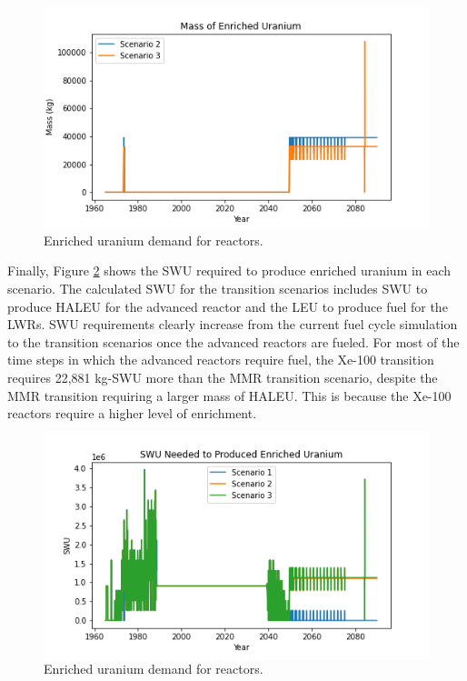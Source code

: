 \begin{figure}[ht]
    \centering
    \includegraphics[scale=0.5]{figures/enrichedU_advancedrx.png}
    \caption{Enriched uranium demand for reactors.}
    \label{fig:enriched_u}
\end{figure}

Finally, Figure \ref{fig:swu} shows the \gls{SWU} required to 
produce enriched uranium in each scenario. The calculated 
\gls{SWU} for the transition scenarios includes \gls{SWU} to 
produce \gls{HALEU} for the advanced reactor and the \gls{LEU}
to produce fuel for the \gls{LWR}s. \gls{SWU} requirements 
clearly increase from the current fuel cycle simulation to the 
transition scenarios once the advanced reactors are fueled. 
For most of the time steps in which the advanced reactors 
require fuel, the Xe-100 transition requires 22,881 kg-SWU 
more than the MMR transition scenario, despite the MMR 
transition requiring a larger mass of \gls{HALEU}. This is 
because the Xe-100 reactors require a higher level of 
enrichment.  

\begin{figure}[ht]
    \centering
    \includegraphics[scale=0.5]{figures/swu_all.png}
    \caption{Enriched uranium demand for reactors.}
    \label{fig:swu}
\end{figure}